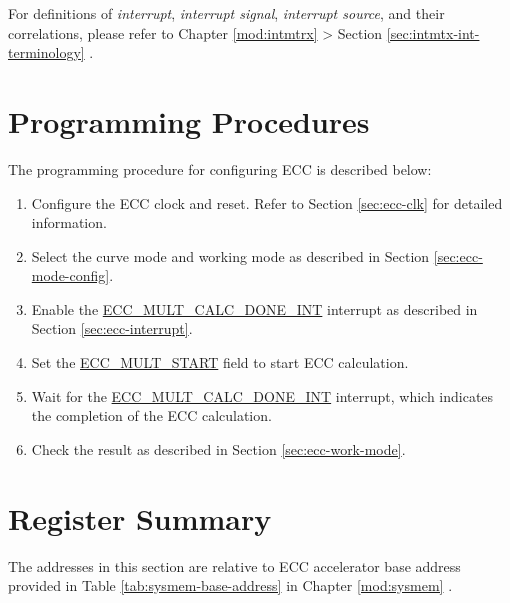 \documentclass[main\_\_EN.tex]{subfiles}
\begin{document}
\begin{tiplisting}
For definitions of \textit{interrupt}, \textit{interrupt signal}, \textit{interrupt source}, and their correlations, please refer to Chapter \ref{mod:intmtrx} \textit{} > Section \ref{sec:intmtx-int-terminology} \textit{}.
\end{tiplisting}


\section{Programming Procedures}

The programming procedure for configuring ECC is described below:

\begin{enumerate}
    \item Configure the ECC clock and reset. Refer to Section \ref{sec:ecc-clk} for detailed information.
    \item Select the curve mode and working mode as described in Section \ref{sec:ecc-mode-config}.
    \item Enable the \hyperref[int:ECCMULTCALCDONEINT]{ECC\_MULT\_CALC\_DONE\_INT} interrupt as described in Section \ref{sec:ecc-interrupt}.
    \item Set the \hyperref[fielddesc:ECCMULTSTART]{ECC\_MULT\_START} field to start ECC calculation.
    \item Wait for the \hyperref[int:ECCMULTCALCDONEINT]{ECC\_MULT\_CALC\_DONE\_INT} interrupt, which indicates the completion of the ECC calculation.
    \item Check the result as described in Section \ref{sec:ecc-work-mode}.
\end{enumerate}




\newpage
\hypertarget{ecc-reg-summ}{}
\section{Register Summary}
\label{sec:ecc-reg-summ}

The addresses in this section are relative to ECC accelerator base address provided in Table \ref{tab:sysmem-base-address} in Chapter \ref{mod:sysmem} \textit{}.
\end{document}
